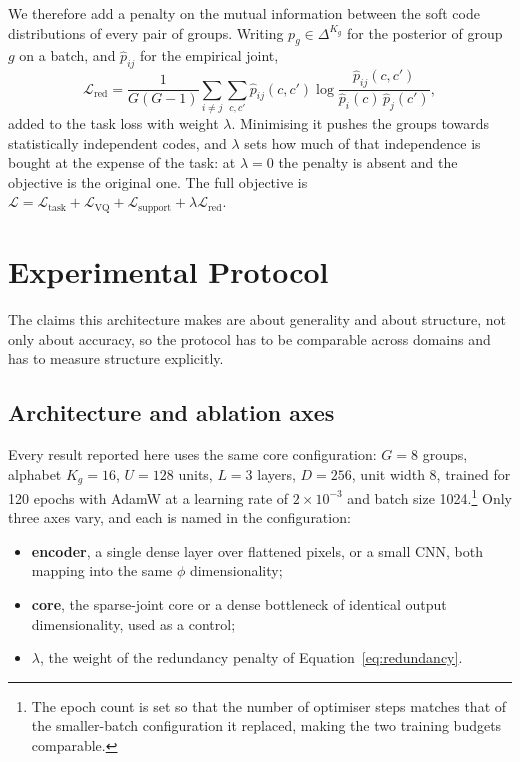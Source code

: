 We therefore add a penalty on the mutual information between the soft code
distributions of every pair of groups. Writing $p_g \in \Delta^{K_g}$ for the
posterior of group $g$ on a batch, and $\hat{p}_{ij}$ for the empirical joint,
\begin{equation}
  \mathcal{L}_{\text{red}} =
  \frac{1}{G(G-1)} \sum_{i \neq j}
  \sum_{c,c'} \hat{p}_{ij}(c,c')
  \log \frac{\hat{p}_{ij}(c,c')}{\hat{p}_i(c)\,\hat{p}_j(c')},
  \label{eq:redundancy}
\end{equation}
added to the task loss with weight $\lambda$. Minimising it pushes the groups
towards statistically independent codes, and $\lambda$ sets how much of that
independence is bought at the expense of the task: at $\lambda=0$ the penalty is
absent and the objective is the original one. The full objective is
$\mathcal{L} = \mathcal{L}_{\text{task}} + \mathcal{L}_{\text{VQ}}
+ \mathcal{L}_{\text{support}} + \lambda \mathcal{L}_{\text{red}}$.


\section{Experimental Protocol}
\label{sec:protocol}

The claims this architecture makes are about generality and about structure,
not only about accuracy, so the protocol has to be comparable across domains
and has to measure structure explicitly.

\subsection{Architecture and ablation axes}

Every result reported here uses the same core configuration: $G=8$ groups,
alphabet $K_g=16$, $U=128$ units, $L=3$ layers, $D=256$, unit width $8$, trained
for 120 epochs with AdamW at a learning rate of $2\times10^{-3}$ and batch
size 1024.\footnote{The epoch count is set so that the number of optimiser steps
matches that of the smaller-batch configuration it replaced, making the two
training budgets comparable.} Only three axes vary, and each is named in the
configuration:

\begin{itemize}[leftmargin=*, itemsep=1pt, topsep=2pt]
  \item \textbf{encoder}, a single dense layer over flattened pixels, or a
        small CNN, both mapping into the same $\phi$ dimensionality;
  \item \textbf{core}, the sparse-joint core or a dense bottleneck of
        identical output dimensionality, used as a control;
  \item \textbf{$\lambda$}, the weight of the redundancy penalty of
        Equation~\ref{eq:redundancy}.
\end{itemize}


